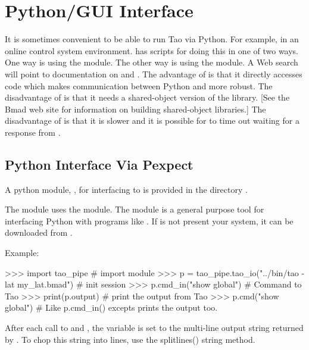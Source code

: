 \chapter{Python/GUI Interface}
\label{c:python}

It is sometimes convenient to be able to run Tao via Python. For example, in an online control
system environment. \tao has scripts for doing this in one of two ways. One way is using the
 module. The other way is using the  module. A Web search will point to
documentation on  and . The advantage of  is that it directly
accesses \tao code which makes communication between Python and \tao more robust. The disadvantage of
 is that it needs a shared-object version of the  library. [See the Bmad web site
for information on building shared-object libraries.] The disadvantage of  is that it is
slower and it is possible for  to time out waiting for a response from \tao.

\section{Python Interface Via Pexpect}

A python module, , for interfacing \tao to 
is provided in the directory .

The  module uses the  module. The
 module is a general purpose tool for interfacing
Python with programs like \tao. If  is not present
your system, it can be downloaded from
. 

Example:
\begin{example}
  >>> import tao_pipe                                       # import module
  >>> p = tao_pipe.tao_io("../bin/tao -lat my_lat.bmad")    # init session
  >>> p.cmd_in("show global")               # Command to Tao
  >>> print(p.output)                       # print the output from Tao
  >>> p.cmd("show global")                  # Like p.cmd_in() excepts prints the output too.
\end{example}

After each call to  and , the
 variable is set to the multi-line output string
returned by \tao. To chop this string into lines, use the splitlines()
string method.

